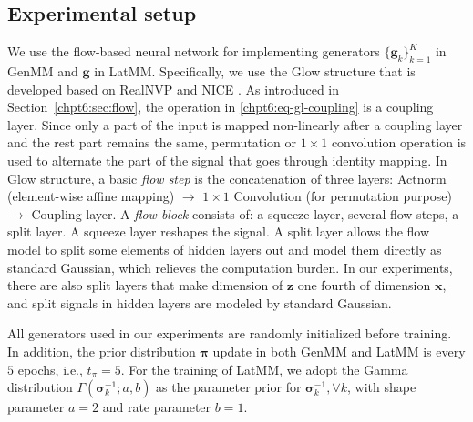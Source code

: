 \subsection{Experimental setup}\label{sub:exp-setup}

We use the flow-based neural network for implementing generators $\{\bm{g}_k\}_{k=1}^{K}$ in GenMM and $\bm{g}$ in LatMM. Specifically, we use the Glow structure \cite{2018arXiv180703039K} that is developed based on RealNVP \cite{2016arXiv160508803D} and NICE \cite{DBLP:journals/corr/DinhKB14}. As introduced in Section~\ref{chpt6:sec:flow}, the operation in \eqref{chpt6:eq-gl-coupling} is a coupling
layer. Since only a part of the input is mapped non-linearly after a coupling
layer and the rest part remains the same, permutation \cite{2016arXiv160508803D} or $1\times 1$ convolution operation \cite{2018arXiv180703039K} is used to alternate the part of the signal that goes through identity mapping. In Glow structure, a basic \textit{flow step} is the concatenation of three layers: Actnorm (element-wise affine mapping)
$\rightarrow$ $1\times 1$ Convolution (for permutation purpose)
$\rightarrow$ Coupling layer. A \textit{flow block} consists of: a squeeze layer,
several flow steps, a split layer. A squeeze layer reshapes the
signal. A split layer allows the flow model to split some elements of hidden layers out and model them
directly as standard Gaussian, which relieves the computation burden. In our experiments, there are also split layers that make dimension of $\bm{z}$ one fourth of dimension $\bm{x}$, and split signals in hidden layers are modeled by standard Gaussian. 

All generators used in our experiments are randomly initialized before training. 
In addition, the prior distribution $\bm{\pi}$ update in both GenMM and LatMM is every $5$ epochs, {i.e.},  $t_{\pi} = 5$. For the training of LatMM, we adopt the Gamma distribution $\Gamma(\bm{\sigma}_k^{-1}; a, b)$ as the parameter prior for $\bm{\sigma}_k^{-1}, \forall k$, with shape parameter $a=2$ and rate parameter $b = 1$.

